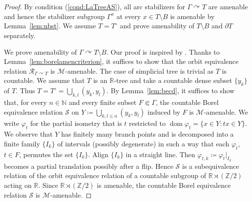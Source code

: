 \documentclass[12pt,nosumlimits,nonamelimits]{amsart}
\theoremstyle{remark}
\theoremstyle{definition}
\newcommand{\IN}{\mathbb{N}}
\newcommand{\IR}{\mathbb{R}}
\newcommand{\IZ}{\mathbb{Z}}
\newcommand{\cM}{\mathcal{M}}
\newcommand{\cR}{\mathcal{R}}
\newcommand{\cS}{\mathcal{S}}
\newcommand{\vp}{\varphi}
\newcommand{\Ga}{\Gamma}
\newcommand{\acts}{\curvearrowright}
\DeclareMathOperator{\dom}{dom}
\begin{document}
\begin{proof}
By condition (\ref{cond:LaTreeAS}), all arc stabilizers 
for $\Ga\acts T$ are amenable and hence the stabilizer 
subgroup $\Ga^x$ at every $x\in \hat{T}\setminus B$ 
is amenable by Lemma~\ref{lem:nbst}. 
We assume $T=T^\circ$ and 
prove amenability of $T\setminus B$ and $\partial T$ separately. 

We prove amenability of $\Ga\acts T\setminus B$. 
Our proof is inspired by \cite{glp}.
Thanks to Lemma~\ref{lem:borelamencriterion}, 
it suffices to show that the orbit equivalence 
relation $\cR_{\Ga\acts T}$ is $\cM$-amenable. 
The case of simplicial tree is trivial as $T$ is countable. 
We assume that $T$ is an $\IR$-tree and take 
a countable dense subset $\{ y_k \}$ of $T$. 
Thus $T = T^\circ = \bigcup_{k,l}(y_k,y_l)$. 
By Lemma~\ref{lem:becd}, it suffices to show that, 
for every $n\in\IN$ and every finite subset $F\Subset\Ga$,
the countable Borel equivalence relation $\cS$ 
on $Y \coloneq \bigcup_{k,l \le n}(y_k,y_l)$ 
induced by $F$ is $\cM$-amenable. 
We write $\vp_t$ for the partial isometry that is $t$ restricted to 
$\dom\vp_t = \{ x\in Y : tx\in Y\}$. 
We observe that $Y$ has finitely many branch points and 
is decomposed into a finite family $\{ I_k\}$ of intervals 
(possibly degenerate) in such a way that each $\vp_t$, $t\in F$, 
permutes the set $\{ I_k\}$. 
Align $\{I_k\}$ in a straight line. 
Then $\vp_{t,k} \coloneq \vp_t|_{I_k}$ becomes a partial translation possibly after a flip. 
Hence $\cS$ is a subequivalence relation 
of the orbit equivalence relation of 
a countable subgroup of $\IR\rtimes(\IZ/2)$ acting on $\IR$.
Since $\IR\rtimes(\IZ/2)$ is amenable, 
the countable Borel equivalence relation $\cS$ is $\cM$-amenable. 


\end{proof}
\end{document}
